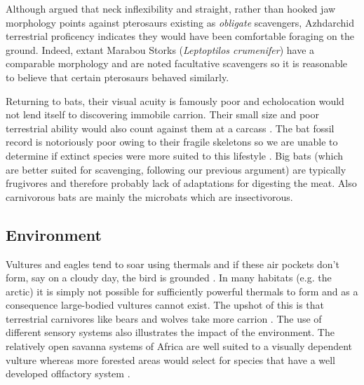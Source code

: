 \documentclass[a4paper,12pt]{article}
\begin{document}
Although \cite{witton2008reappraisal} argued that neck inflexibility and straight, rather than hooked jaw morphology points against pterosaurs existing as \textit{obligate} scavengers, Azhdarchid terrestrial proficency indicates they would have been comfortable foraging on the ground.
Indeed, extant Marabou Storks (\textit{Leptoptilos crumenifer}) %
have a comparable morphology and are noted facultative scavengers so it is reasonable to believe that certain pterosaurs behaved similarly.

Returning to bats, their visual acuity is famously poor and echolocation would not lend itself to discovering immobile carrion.
Their small size and poor terrestrial ability would also count against them at a carcass \citep{riskin2006terrestrial}.
The bat fossil record is notoriously poor owing to their fragile skeletons so we are unable to determine if extinct species were more suited to this lifestyle \citep{eiting2009global}.
Big bats (which are better suited for scavenging, following our previous argument) are typically frugivores and therefore probably lack of adaptations for digesting the meat.
Also carnivorous bats are mainly the microbats which are insectivorous.


\subsection*{Environment}
Vultures and eagles tend to soar using thermals and if these air pockets don't form, say on a cloudy day, the bird is grounded \citep{mundy1992vultures}.
In many habitats (e.g. the arctic) it is simply not possible for sufficiently powerful thermals to form and as a consequence large-bodied vultures cannot exist.
The upshot of this is that terrestrial carnivores like bears and wolves take more carrion \citep{devault2003scavenging}.
The use of different sensory systems also illustrates the impact of the environment. 
The relatively open savanna systems of Africa are well suited to a visually dependent vulture whereas more forested areas would select for species that have a well developed oflfactory system  \citep{houston1986olfaction}. 
\end{document}
